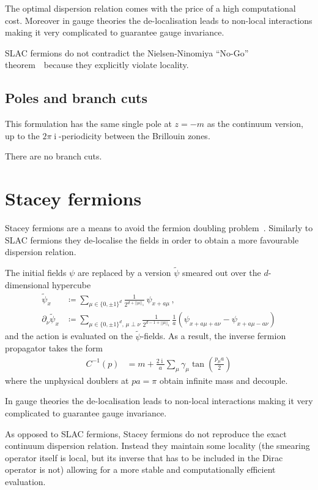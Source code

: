 \documentclass[a4paper]{article}
\DeclareMathOperator{\im}{i}
\newcommand{\nnt}{Nielsen-Ninomiya ``No-Go'' theorem~\cite{NIELSEN1981219}}
\begin{document}
	The optimal dispersion relation comes with the price of a high computational cost.
	Moreover in gauge theories the de-localisation leads to non-local interactions making it very complicated to guarantee gauge invariance.
	
	SLAC fermions do not contradict the \nnt\ because they explicitly violate locality.
	
	\subsection{Poles and branch cuts}
	This formulation has the same single pole at $z=-m$ as the continuum version, up to the $2\pi\im$-periodicity between the Brillouin zones.
	
	There are no branch cuts.
	
	\section{Stacey fermions}
	Stacey fermions are a means to avoid the fermion doubling problem~\cite{Stacey_1982}. Similarly to SLAC fermions they de-localise the fields in order to obtain a more favourable dispersion relation.
	
	The initial fields $\psi$ are replaced by a version $\tilde\psi$ smeared out over the $d$-dimensional hypercube
	\begin{align}
		\tilde{\psi}_x &\coloneqq \sum_{\mu\in\{0,\pm1\}^d}\frac{1}{2^{d+||\mu||_1}}\,\psi_{x+a\mu}\,,\\
		\partial_\nu\tilde{\psi}_x &\coloneqq \sum_{\mu\in\{0,\pm1\}^d,\,\mu\perp\nu}\frac{1}{2^{d-1+||\mu||_1}}\,\frac1a \left(\psi_{x+a\mu+a\nu}-\psi_{x+a\mu-a\nu}\right)
	\end{align}
	and the action is evaluated on the $\tilde\psi$-fields.
	As a result, the inverse fermion propagator takes the form
	\begin{align}
		C^{-1}(p) &= m + \frac{2\im}{a}\sum_\mu \gamma_\mu\tan\left(\frac{p_\mu a}{2}\right)
	\end{align}
	where the unphysical doublers at $pa=\pi$ obtain infinite mass and decouple.
	
	In gauge theories the de-localisation leads to non-local interactions making it very complicated to guarantee gauge invariance.
	
	As opposed to SLAC fermions, Stacey fermions do not reproduce the exact continuum dispersion relation. Instead they maintain some locality (the smearing operator itself is local, but its inverse that has to be included in the Dirac operator is not) allowing for a more stable and computationally efficient evaluation.
	
\end{document}
